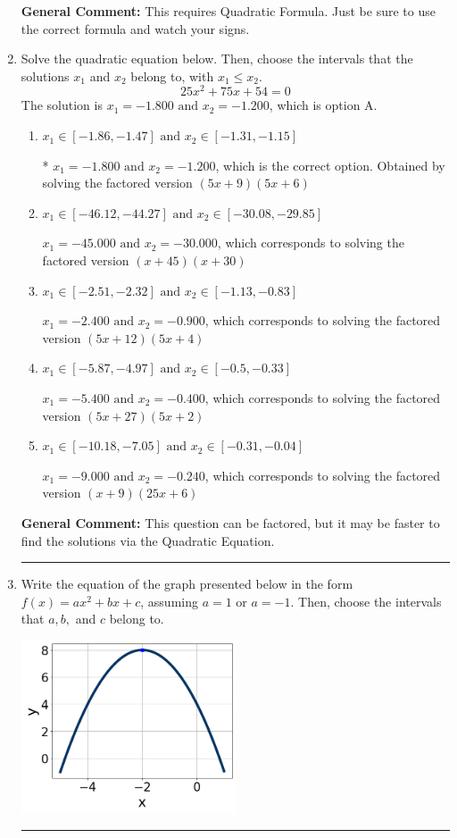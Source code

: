 \documentclass{extbook}[14pt]
\newcommand{\litem}[1]{\item #1

\rule{\textwidth}{0.4pt}}
\begin{document}
\begin{enumerate}
{\textbf{General Comment:} This requires Quadratic Formula. Just be sure to use the correct formula and watch your signs.
}
\litem{
Solve the quadratic equation below. Then, choose the intervals that the solutions $x_1$ and $x_2$ belong to, with $x_1 \leq x_2$.
\[ 25x^{2} +75 x + 54 = 0 \]The solution is \( x_1 = -1.800 \text{ and } x_2 = -1.200 \), which is option A.\begin{enumerate}[label=\Alph*.]
\item \( x_1 \in [-1.86, -1.47] \text{ and } x_2 \in [-1.31, -1.15] \)

* $x_1 = -1.800 \text{ and } x_2 = -1.200$, which is the correct option. Obtained by solving the factored version $(5x + 9)(5x + 6)$
\item \( x_1 \in [-46.12, -44.27] \text{ and } x_2 \in [-30.08, -29.85] \)

$x_1 = -45.000 \text{ and } x_2 = -30.000$, which corresponds to solving the factored version $(x + 45)(x + 30)$
\item \( x_1 \in [-2.51, -2.32] \text{ and } x_2 \in [-1.13, -0.83] \)

$x_1 = -2.400 \text{ and } x_2 = -0.900$, which corresponds to solving the factored version $(5x + 12)(5x + 4)$
\item \( x_1 \in [-5.87, -4.97] \text{ and } x_2 \in [-0.5, -0.33] \)

$x_1 = -5.400 \text{ and } x_2 = -0.400$, which corresponds to solving the factored version $(5x + 27)(5x + 2)$
\item \( x_1 \in [-10.18, -7.05] \text{ and } x_2 \in [-0.31, -0.04] \)

$x_1 = -9.000 \text{ and } x_2 = -0.240$, which corresponds to solving the factored version $(x + 9)(25x + 6)$
\end{enumerate}

\textbf{General Comment:} This question can be factored, but it may be faster to find the solutions via the Quadratic Equation.
}
\litem{
Write the equation of the graph presented below in the form $f(x)=ax^2+bx+c$, assuming  $a=1$ or $a=-1$. Then, choose the intervals that $a, b,$ and $c$ belong to.

\begin{center}
    \includegraphics[width=0.5\textwidth]{../Figures/quadraticGraphToEquationB.png}
\end{center}


}
\end{enumerate}
\end{document}
